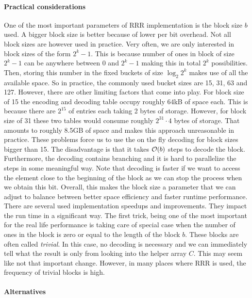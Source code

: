 \paragraph{Practical considerations}
\label{subsection:block_size}

One of the most important parameters of RRR implementation is the block
size $b$ used. A bigger block size is better because of lower per bit overhead. Not
all block sizes are however used in practice. Very often, we are only interested in
block sizes of the form $2^k-1$. This is because number of ones in block of size $2^k-1$
can be anywhere between 0 and $2^k-1$ making this in total $2^k$ possibilities. Then, storing
this number in the fixed buckets of size $\log_2 2^k$ makes use of all the available space.
So in practice, the commonly used bucket sizes are 15, 31, 63 and 127. However, there are
other limiting factors that come into play. For block size of 15 the encoding and decoding table
occupy roughly 64kB of space each. This is because there are $2^{15}$ of entries each taking
2 bytes of storage. However, for block size of 31 these two tables would consume roughly
$2^{31}\cdot 4$ bytes of storage. That amounts to roughly 8.5GB of space and makes this approach
unreasonable in practice. These problems force us to use the on the fly decoding for block sizes
bigger than 15. The disadvantage is that it takes $\mathcal{O}(b)$ steps to decode the block. Furthermore,
the decoding contains branching and it is hard to parallelize the steps in some meaningful way.
Note that decoding is faster if we want to access the element close to the beginning of
the block as we can stop the process when we obtain this bit. Overall, this makes the block
size a parameter that we can adjust to balance between better space efficiency and faster
runtime performance. There are several used implementation speedups and improvements.
They impact the run time in a significant way. The first trick, being one of the most important
for the real life performance is taking care of special case when the number of ones in the block
is zero or equal to the length of the block $b$. These blocks are often called \textit{trivial}. 
In this case, no decoding is necessary and we can immediately tell what the result is only from
looking into the helper array $C$. This may seem like not that important change. However, in many
places where RRR is used, the frequency of trivial blocks is high.

\paragraph{Alternatives}

